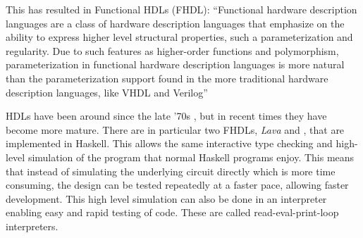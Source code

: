 		This has resulted in Functional HDLs (FHDL): ``Functional hardware
		description languages are a class of hardware description languages
		that emphasize on the ability to express higher level structural
		properties, such a parameterization and regularity. Due to such
		features as higher-order functions and polymorphism, parameterization
		in functional hardware description languages is more natural than the
		parameterization support found in the more traditional hardware
		description languages, like VHDL and Verilog'' \cite{Baaij2009}
		
		HDLs have been around since the late '70s \cite{Chen2012},
		but in recent times they have become more mature\cite{TODO}. There are in
		particular two FHDLs, \emph{Lava} and \clash \cite{Baaij2009,
		Bjesse1998}, that are implemented in Haskell. This allows the same
		interactive type checking and high-level simulation of the program that
		normal Haskell programs enjoy. This means that instead of simulating
		the underlying circuit directly which is more time consuming, the
		design can be tested repeatedly at a faster pace, allowing faster
		development. This high level simulation can also be done in an
		interpreter enabling easy and rapid testing of code. These are called
		read-eval-print-loop interpreters.
